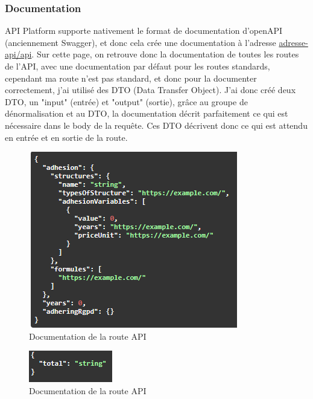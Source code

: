 \documentclass[a4paper,12pt]{report}
\begin{document}
\subsubsection{Documentation}

API Platform supporte nativement le format de documentation d'openAPI (anciennement Swagger), et donc cela crée une documentation à l'adresse \href{https://dev.api.numerobis.atd16.fr/api}{adresse-api/api}. Sur cette page, on retrouve donc la documentation de toutes les routes de l'API, avec une documentation par défaut pour les routes standards, cependant ma route n'est pas standard, et donc pour la documenter correctement, j'ai utilisé des DTO (Data Transfer Object). J'ai donc créé deux DTO, un "input" (entrée) et "output" (sortie), grâce au groupe de dénormalisation et au DTO, la documentation décrit parfaitement ce qui est nécessaire dans le body de la requête. Ces DTO décrivent donc ce qui est attendu en entrée et en sortie de la route.

\begin{figure}[ht]
    \centering
    \includegraphics[scale=0.8]{docSimulatorInput.png}
    \caption{Documentation de la route API}
    \label{fig:swagger-simulator-in}
\end{figure}

\begin{figure}[ht]
    \centering
    \includegraphics[scale=0.8]{docSimulatorOutput.png}
    \caption{Documentation de la route API}
    \label{fig:swagger-simulator-out}
\end{figure}
\end{document}
